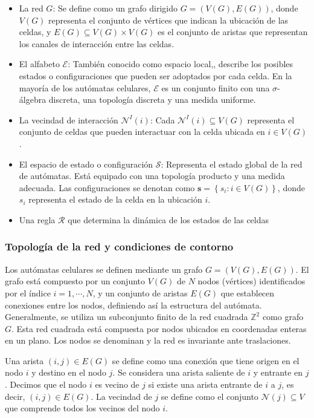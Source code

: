 \begin{itemize}
\item La red  $G$: Se define como un grafo dirigido  $G=(V(G),E(G))$, donde $V(G)$  representa el conjunto de vértices que indican la ubicación de las celdas,  y $E(G)\subseteq V(G)\times V(G)$ es el conjunto de aristas que representan los canales de interacción entre las celdas.
\item El alfabeto $\mathcal{E}$: También conocido como espacio local,, describe los posibles estados o configuraciones que pueden ser adoptados por cada celda. En la mayoría de los autómatas celulares, $\mathcal{E}$ es un conjunto finito con una $\sigma$- álgebra discreta, una topología discreta y una medida uniforme.
\item La vecindad de interacción $\mathcal{N}^I(i)$:  Cada $\mathcal{N}^I(i)\subseteq V(G)$ representa el conjunto de celdas que pueden interactuar con la celda ubicada en $i\in V(G)$. 
\item  El espacio de estado o configuración $\mathcal{S}$:  Representa el estado global de la red de autómatas.   Está equipado con una topología producto y una medida adecuada.  Las configuraciones se denotan como $\mathbf{s}=\left\{s_i:i\in V(G)\right\}$, donde $s_i$ representa el estado de la celda en la ubicación  $i$.
\item Una regla $\mathcal{R}$ que determina la dinámica de los estados de las celdas
\end{itemize}


\subsubsection{Topología de la red y condiciones de contorno}

Los autómatas celulares se definen mediante un grafo $G = (V(G), E(G))$.  El grafo está compuesto por un conjunto $V(G)$ de $N$ nodos (vértices) identificados por el índice $i = 1, \cdots, N$, y un conjunto de aristas $E(G)$ que establecen conexiones entre los nodos, definiendo así la estructura del autómata.  Generalmente, se utiliza un subconjunto finito de la red cuadrada $\mathbb{Z}^2$ como grafo $G$. Esta red cuadrada está compuesta por nodos ubicados en coordenadas enteras en un plano. Los nodos se denominan  y la red es invariante ante traslaciones. 

Una arista $(i,j)\in E(G)$ se define como una conexión que tiene origen en el nodo $i$ y destino en el nodo $j$. Se considera una arista saliente de $i$ y entrante en $j$. Decimos que el nodo $i$ es vecino de $j$ si existe una arista entrante de $i$ a $j$, es decir, $(i, j) \in E(G)$. La vecindad de $j$ se define como el conjunto $\mathcal{N}(j) \subseteq V$ que comprende todos los vecinos del nodo $i$.  

